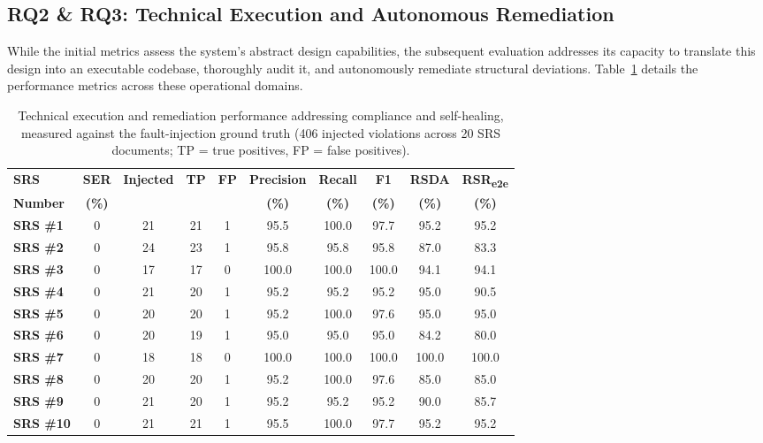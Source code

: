 \subsection{RQ2 \& RQ3: Technical Execution and Autonomous Remediation}

While the initial metrics assess the system's abstract design capabilities, the subsequent evaluation addresses its capacity to translate this design into an executable codebase, thoroughly audit it, and autonomously remediate structural deviations. Table~\ref{tab:execution_results} details the performance metrics across these operational domains.

\begin{table}[htbp]
\centering
\caption{Technical execution and remediation performance addressing compliance and self-healing, measured against the fault-injection ground truth (406 injected violations across 20 SRS documents; TP = true positives, FP = false positives).}
\label{tab:execution_results}
\renewcommand{\arraystretch}{1.2}
\begin{tabular}{lccccccccc}
\toprule
\textbf{SRS} & \textbf{SER} & \textbf{Injected} & \textbf{TP} & \textbf{FP} & \textbf{Precision} & \textbf{Recall} & \textbf{F1} & \textbf{RSDA} & \textbf{RSR\textsubscript{e2e}} \\
\textbf{Number} & \textbf{(\%)} & & & & \textbf{(\%)} & \textbf{(\%)} & \textbf{(\%)} & \textbf{(\%)} & \textbf{(\%)} \\
\midrule
\textbf{SRS \#1}  & 0 & 21 & 21 & 1 & 95.5 & 100.0 & 97.7 & 95.2 & 95.2 \\
\textbf{SRS \#2}  & 0 & 24 & 23 & 1 & 95.8 & 95.8 & 95.8 & 87.0 & 83.3 \\
\textbf{SRS \#3}  & 0 & 17 & 17 & 0 & 100.0 & 100.0 & 100.0 & 94.1 & 94.1 \\
\textbf{SRS \#4}  & 0 & 21 & 20 & 1 & 95.2 & 95.2 & 95.2 & 95.0 & 90.5 \\
\textbf{SRS \#5}  & 0 & 20 & 20 & 1 & 95.2 & 100.0 & 97.6 & 95.0 & 95.0 \\
\textbf{SRS \#6}  & 0 & 20 & 19 & 1 & 95.0 & 95.0 & 95.0 & 84.2 & 80.0 \\
\textbf{SRS \#7}  & 0 & 18 & 18 & 0 & 100.0 & 100.0 & 100.0 & 100.0 & 100.0 \\
\textbf{SRS \#8}  & 0 & 20 & 20 & 1 & 95.2 & 100.0 & 97.6 & 85.0 & 85.0 \\
\textbf{SRS \#9}  & 0 & 21 & 20 & 1 & 95.2 & 95.2 & 95.2 & 90.0 & 85.7 \\
\textbf{SRS \#10} & 0 & 21 & 21 & 1 & 95.5 & 100.0 & 97.7 & 95.2 & 95.2 \\

\end{tabular}
\end{table}
